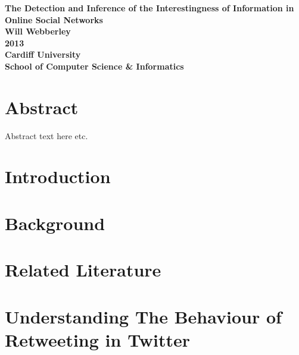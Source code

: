




\frontmatter

\begin{titlepage}

\begin{center}
\vspace*{3ex}
\textbf{\Huge The Detection and Inference of  the Interestingness of Information in Online Social Networks}\\[2ex]

\textbf{\LARGE Will Webberley}\\
\vfill
\textbf{\LARGE 2013}\\
\vfill
\textbf{\LARGE Cardiff University}\\[1ex]
\textbf{\LARGE School of Computer Science \& Informatics}\\[4ex]
\end{center}

\end{titlepage}

\chapter*{Abstract}
Abstract text here etc.

\tableofcontents
\listoffigures
\listoftables




\mainmatter 

\chapter{Introduction}


\chapter{Background}


\chapter{Related Literature}


\chapter{Understanding The Behaviour of Retweeting in Twitter}


